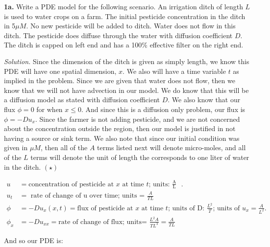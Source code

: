 \documentclass{article}
\begin{document}
\setlength{\parindent}{0cm}   %



\textbf{1a.}  Write a PDE model for the following scenario. An irrigation ditch of length \(L\) is used to water crops on a farm. The initial pesticide concentration in the ditch in 5\(\mu M\). No new pesticide will be added to ditch. Water does not flow in this ditch. The pesticide does diffuse through the water with diffusion coefficient \(D\). The ditch is capped on left end and has a 100\% effective filter on the right end. 


\vspace{3mm}
\textit{Solution.}  Since the dimension of the ditch is given as simply length, we know this PDE will have one spatial dimension, \(x\). We also will have a time variable \(t\) as implied in the problem. Since we are given that water does not flow, then we know that we will not have advection in our model. We do know that this will be a diffusion model as stated with diffusion coefficient \(D\). We also know that our flux \( \phi = 0\) for when \( x \leq 0\). And since this is a diffusion only problem, our flux is \( \phi = -Du_x \). Since the farmer is not adding pesticide, and we are not concerned about the concentration outside the region, then our model is justified in not having a source or sink term. We also note that since our initial condition was given in \(\mu\!M\), then all of the \(A\) terms listed next will denote micro-moles, and all of the \(L\) terms will denote the unit of length the corresponds to one liter of water in the ditch. \(( \star) \)

\begin{align*} 
u &= \text{concentration of pesticide at \(x\) at time \(t\);  units: \(\frac{\text{A}}{\text{L}}\) }. \\
u_t &=  \text{ rate of change of u over time; units = } \frac{A}{TL}\\
\phi&= -Du_x(x,t) = \text{flux of pesticide at \(x\) at time \(t\);  units of D: \(\frac{L^2}{T}\); units of \(u_x= \frac{A}{L^2} \). }\\
\phi_x &= -Du_{xx} = \text{rate of change of flux; units= } \frac{ L^2 A}{T L^3} =  \frac{  A}{T L} 
\end{align*}

And so our PDE is:  
\end{document}
